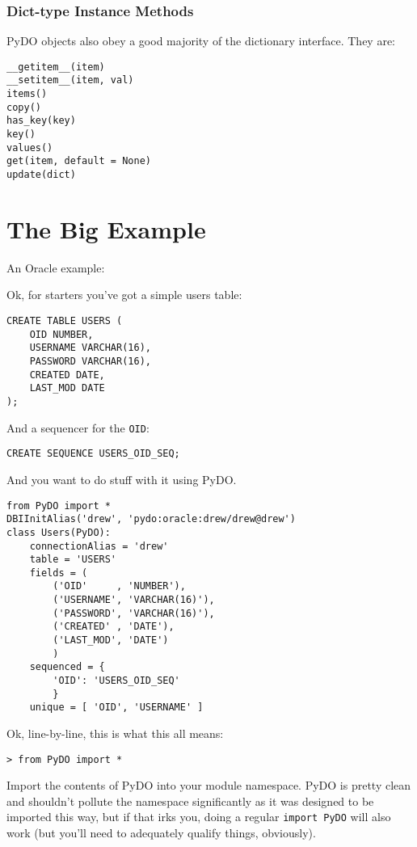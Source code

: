 \documentclass[titlepage]{manual}
\begin{document}
\subsection{Dict-type Instance Methods}
PyDO objects also obey a good majority of the dictionary interface.
They are:
\begin{verbatim}
__getitem__(item)
__setitem__(item, val)
items()
copy()
has_key(key)
key()
values()
get(item, default = None)
update(dict)
\end{verbatim}


\chapter{The Big Example}
An Oracle example:

Ok, for starters you've got a simple users table:

\begin{verbatim}
CREATE TABLE USERS (
    OID NUMBER,
    USERNAME VARCHAR(16),
    PASSWORD VARCHAR(16),
    CREATED DATE,
    LAST_MOD DATE
);
\end{verbatim}

And a sequencer for the \texttt{OID}:

\begin{verbatim}
CREATE SEQUENCE USERS_OID_SEQ;
\end{verbatim}

And you want to do stuff with it using PyDO.

\begin{verbatim}
from PyDO import *
DBIInitAlias('drew', 'pydo:oracle:drew/drew@drew')
class Users(PyDO):
    connectionAlias = 'drew'
    table = 'USERS'
    fields = (
        ('OID'     , 'NUMBER'),
        ('USERNAME', 'VARCHAR(16)'),
        ('PASSWORD', 'VARCHAR(16)'),
        ('CREATED' , 'DATE'),
        ('LAST_MOD', 'DATE')
        )
    sequenced = {
        'OID': 'USERS_OID_SEQ'
        }
    unique = [ 'OID', 'USERNAME' ]
\end{verbatim}

Ok, line-by-line, this is what this all means:

\begin{verbatim}
> from PyDO import *
\end{verbatim}

Import the contents of PyDO into your module namespace.  PyDO is
pretty clean and shouldn't pollute the namespace significantly as it
was designed to be imported this way, but if that irks you, doing a
regular \texttt{import PyDO} will also work (but you'll need to
adequately qualify things, obviously).
\end{document}
